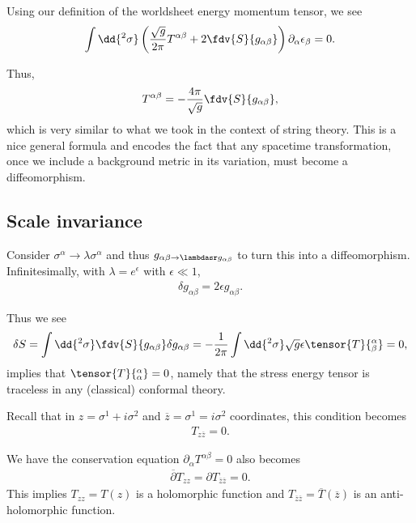 Using our definition of the worldsheet energy momentum tensor, we see
\begin{align}
    \int \dd{^2 \sigma} \left( \frac{\sqrt{g}}{2\pi} T^{\alpha \beta} + 2 \fdv{S}{g_{\alpha \beta}}  \right) \partial_\alpha \epsilon_\beta = 0 
.\end{align}

Thus,
\begin{align}
    T^{\alpha \beta} = -\frac{4\pi}{\sqrt{g} } \fdv{S}{g_{\alpha\beta}}
,\end{align}
which is very similar to what we took in the context of string theory. This is a nice general formula and encodes the fact that any spacetime transformation, once we include a background metric in its variation, must become a diffeomorphism.

\subsection{Scale invariance}

Consider $\sigma^{\alpha} \to \lambda \sigma^{\alpha}$ and thus $g_{\alpha \beta \to \lambdasr g_{\alpha \beta}}$ to turn this into a diffeomorphism. Infinitesimally, with $\lambda = e^{\epsilon}$ with $\epsilon \ll 1$,
\begin{align}
    \delta g_{\alpha \beta} = 2 \epsilon g_{\alpha \beta}
.\end{align}

Thus we see
\begin{align}
    \delta S = \int \dd{^2 \sigma} \fdv{S}{g_{\alpha \beta}} \delta g_{\alpha \beta} = -\frac{1}{2\pi} \int \dd{^2 \sigma} \sqrt{g}  \epsilon \tensor{T}{^{\alpha}_{\beta}} = 0
,\end{align}
implies that $\tensor{T}{^{\alpha}_{\alpha}} = 0$, namely that the stress energy tensor is traceless in any (classical) conformal theory.

Recall that in $z = \sigma^{1} + i \sigma^2$ and $\overline{z} = \sigma^{1} = i \sigma^2$ coordinates, this condition becomes
\begin{align}
    T_{z \overline{z}} = 0
.\end{align}

We have the conservation equation $\partial_\alpha T^{\alpha \beta} = 0$ also becomes
\begin{align}
    \overline{\partial} T_{zz} = \partial T_{\overline{z}\overline{z}} = 0
.\end{align}
This implies $T_{z z} = T\left( z \right)  $ is a holomorphic function and $T_{\overline{z} \overline{z}} = \overline{T}\left( \overline{z} \right)$ is an anti-holomorphic function.





